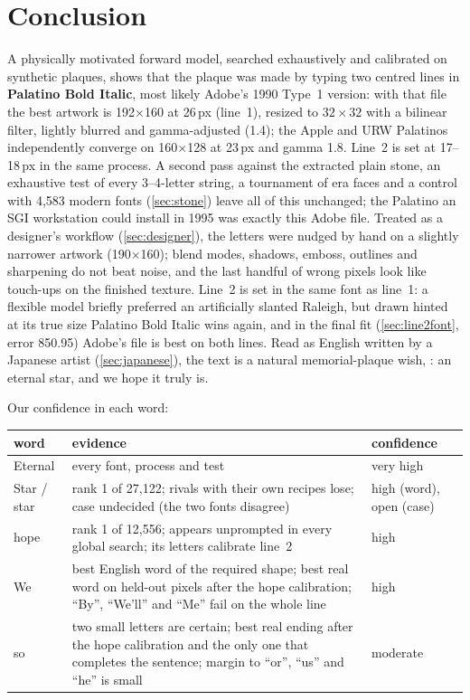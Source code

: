 \documentclass[10pt,a4paper]{article}
\newcommand{\q}[1]{``#1''}
\begin{document}
\section{Conclusion}
\label{sec:conclusion}
A physically motivated forward model, searched exhaustively and calibrated on synthetic plaques, shows that the plaque
was made by typing two centred lines in \textbf{Palatino Bold Italic}, most likely Adobe's 1990 Type~1 version: with
that file the best artwork is 192$\times$160 at 26\,px (line~1), resized to $32{\times}32$ with a bilinear filter, lightly
blurred and gamma-adjusted (1.4); the Apple and URW Palatinos independently converge on 160$\times$128 at 23\,px and
gamma 1.8. Line~2 is set at 17--18\,px in the same process. A second pass against the extracted plain stone, an
exhaustive test of every 3--4-letter string, a tournament of \EraN{} era faces and a control with 4{,}583 modern fonts
(\cref{sec:stone}) leave all of this unchanged; the Palatino an SGI workstation could install in 1995 was exactly this Adobe file. Treated as a designer's
workflow (\cref{sec:designer}), the letters were nudged by hand on a slightly narrower artwork (190$\times$160);
blend modes, shadows, emboss, outlines and sharpening do not beat noise, and the last handful of wrong pixels look
like touch-ups on the finished texture. Line~2 is set in the same font as line~1: a flexible model briefly preferred
an artificially slanted Raleigh, but drawn hinted at its true size Palatino Bold Italic wins again, and in the final fit
(\cref{sec:line2font}, error 850.95) Adobe's file is best on both lines. Read as English written by a Japanese artist (\cref{sec:japanese}), the text is a natural
memorial-plaque wish, : an eternal star, and we hope it truly is.

Our confidence in each word:

\begin{center}\begin{tabular}{p{1.6cm}p{8.6cm}p{3.6cm}}\toprule
word & evidence & confidence\\\midrule
Eternal & every font, process and test & very high\\
Star / star & rank 1 of 27{,}122; rivals with their own recipes lose; case undecided (the two fonts disagree) & high (word), open (case)\\
hope & rank 1 of 12{,}556; appears unprompted in every global search; its letters calibrate line~2 & high\\
We & best English word of the required shape; best real word on held-out pixels after the hope calibration; \q{By},
\q{We'll} and \q{Me} fail on the whole line & high\\
so & two small letters are certain; best real ending after the hope calibration and the only one that completes the
sentence; margin to \q{or}, \q{us} and \q{he} is small & moderate\\\bottomrule
\end{tabular}\end{center}
\end{document}
